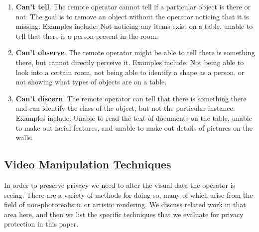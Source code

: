 \documentclass{acm_proc_article-sp}
\begin{document}
\begin{enumerate}
  \item \textbf{Can't tell}.  The remote operator cannot tell if a particular object is there or not. The goal is to remove an object without the operator noticing that it is missing.  Examples include:  Not noticing any items exist on a table, unable to tell that there is a person present in the room.  
  \item \textbf{Can't observe}.  The remote operator might be able to tell there is something there, but cannot directly perceive it.  Examples include:  Not being able to look into a certain room, not being able to identify a shape as a person, or not showing what types of objects are on a table.
  \item \textbf{Can't discern}.  The remote operator can tell that there is something there and can identify the class of the object, but not the particular instance.  Examples include:  Unable to read the text of documents on the table, unable to make out facial features, and unable to make out details of pictures on the walls.
  
\end{enumerate}

\subsection{Video Manipulation Techniques}
In order to preserve privacy we need to alter the visual data the operator is seeing.  There are a variety of methods for doing so, many of which arise from the field of non-photorealistic or artistic rendering.  We discuss related work in that area here, and then we list the specific techniques that we evaluate for privacy protection in this paper.
\end{document}

